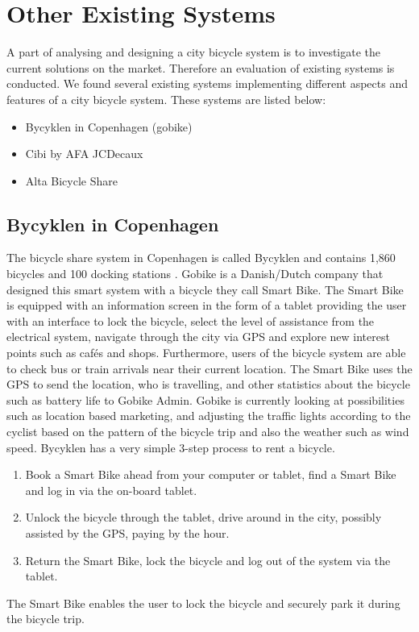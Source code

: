 \section{Other Existing Systems}
A part of analysing and designing a city bicycle system is to investigate the current solutions on the market. 
Therefore an evaluation of existing systems is conducted.
We found several existing systems implementing different aspects and features of a city bicycle system. 
These systems are listed below:
\begin{itemize}
\item Bycyklen in Copenhagen (gobike)
\item Cibi by AFA JCDecaux
\item Alta Bicycle Share
\end{itemize}
\subsection{Bycyklen in Copenhagen}
The bicycle share system in Copenhagen is called Bycyklen and contains 1,860 bicycles and 100 docking stations \citep{misc:bycyklen}. 
Gobike is a Danish/Dutch company that designed this smart system with a bicycle they call Smart Bike. 
The Smart Bike is equipped with an information screen in the form of a tablet providing the user with an interface to lock the bicycle, select the level of assistance from the electrical system, navigate through the city via GPS and explore new interest points such as cafés and shops.
Furthermore, users of the bicycle system are able to check bus or train arrivals near their current location.
The Smart Bike uses the GPS to send the location, who is travelling, and other statistics about the bicycle such as battery life to Gobike Admin.
Gobike is currently looking at possibilities such as location based marketing, and adjusting the traffic lights according to the cyclist based on the pattern of the bicycle trip and also the weather such as wind speed.
Bycyklen has a very simple 3-step process to rent a bicycle.
\begin{enumerate}
\item Book a Smart Bike ahead from your computer or tablet, find a Smart Bike and log in via the on-board tablet.
\item Unlock the bicycle through the tablet, drive around in the city, possibly assisted by the GPS, paying by the hour.
\item Return the Smart Bike, lock the bicycle and log out of the system via the tablet.
\end{enumerate}
The Smart Bike enables the user to lock the bicycle and securely park it during the bicycle trip.

